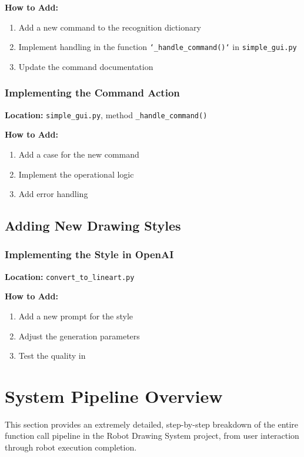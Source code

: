 \documentclass[a4paper,12pt]{article}
\begin{document}
\textbf{How to Add:}
\begin{enumerate}
\item Add a new command to the recognition dictionary
\item Implement handling in the function \texttt{`\_handle\_command()`} in \texttt{simple\_gui.py}
\item Update the command documentation
\end{enumerate}

\subsubsection{Implementing the Command Action}
\textbf{Location:} \texttt{simple\_gui.py}, method \texttt{\_handle\_command()}

\textbf{How to Add:}
\begin{enumerate}
\item Add a case for the new command
\item Implement the operational logic
\item Add error handling
\end{enumerate}

\subsection{Adding New Drawing Styles}

\subsubsection{Implementing the Style in OpenAI}
\textbf{Location:} \texttt{convert\_to\_lineart.py}

\textbf{How to Add:}
\begin{enumerate}
\item Add a new prompt for the style
\item Adjust the generation parameters
\item Test the quality in
\end{enumerate}

\section{System Pipeline Overview}

This section provides an extremely detailed, step-by-step breakdown of the entire function call pipeline in the Robot Drawing System project, from user interaction through robot execution completion.
\end{document}
